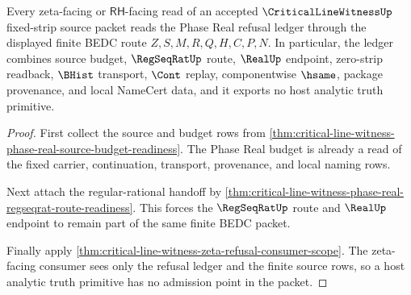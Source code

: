 \begin{theorem}
\label{thm:critical-line-witness-phase-real-zeta-refusal-ledger}
Every zeta-facing or $\mathsf{RH}$-facing read of an accepted $\CriticalLineWitnessUp$ fixed-strip source packet reads the Phase Real refusal ledger through the displayed finite BEDC route $Z,S,M,R,Q,H,C,P,N$. In particular, the ledger combines source budget, $\RegSeqRatUp$ route, $\RealUp$ endpoint, zero-strip readback, $\BHist$ transport, $\Cont$ replay, componentwise $\hsame$, package provenance, and local NameCert data, and it exports no host analytic truth primitive.
\end{theorem}
\begin{proof}
First collect the source and budget rows from \autoref{thm:critical-line-witness-phase-real-source-budget-readiness}. The Phase Real budget is already a read of the fixed carrier, continuation, transport, provenance, and local naming rows.

Next attach the regular-rational handoff by \autoref{thm:critical-line-witness-phase-real-regseqrat-route-readiness}. This forces the $\RegSeqRatUp$ route and $\RealUp$ endpoint to remain part of the same finite BEDC packet.

Finally apply \autoref{thm:critical-line-witness-zeta-refusal-consumer-scope}. The zeta-facing consumer sees only the refusal ledger and the finite source rows, so a host analytic truth primitive has no admission point in the packet.
\end{proof}

